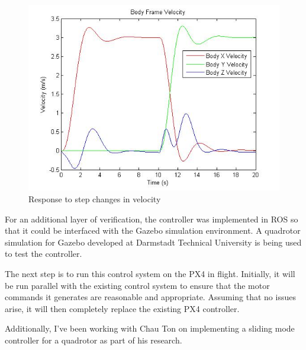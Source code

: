 \documentclass{article}
\begin{document}
\begin{figure}[h]
\includegraphics[width=1\textwidth]{control}
\caption{Response to step changes in velocity}
\label{fig:control}
\end{figure}

For an additional layer of verification, the controller was implemented in ROS so that it could be interfaced with the Gazebo simulation environment. A quadrotor simulation for Gazebo developed at Darmstadt Technical University is being used to test the controller.

The next step is to run this control system on the PX4 in flight. Initially, it will be run parallel with the existing control system to ensure that the motor commands it generates are reasonable and appropriate. Assuming that no issues arise, it will then completely replace the existing PX4 controller.

Additionally, I've been working with Chau Ton on implementing a sliding mode controller for a quadrotor as part of his research.

\printbibliography
\end{document}
